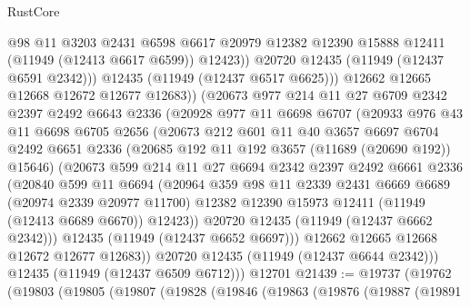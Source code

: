 \begin{lexlean}{RustCore}
\begin{coremodule}
                  @98
                  @11
                  @3203
                  @2431
                  @6598
                  @6617
                  @20979
                  @12382
                  @12390
                  @15888
                  @12411
                  (@11949 (@12413 @6617 @6599))
                  @12423))
              @20720
              @12435
              (@11949 (@12437 @6591 @2342)))
            @12435
            (@11949 (@12437 @6517 @6625)))
          @12662
          @12665
          @12668
          @12672
          @12677
          @12683))
      (@20673
        @977
        @214
        @11
        @27
        @6709
        @2342
        @2397
        @2492
        @6643
        @2336
        (@20928
          @977
          @11
          @6698
          @6707
          (@20933
            @976
            @43
            @11
            @6698
            @6705
            @2656
            (@20673
              @212
              @601
              @11
              @40
              @3657
              @6697
              @6704
              @2492
              @6651
              @2336
              (@20685 @192 @11 @192 @3657 (@11689 (@20690 @192)) @15646)
              (@20673
                @599
                @214
                @11
                @27
                @6694
                @2342
                @2397
                @2492
                @6661
                @2336
                (@20840
                  @599
                  @11
                  @6694
                  (@20964
                    @359
                    @98
                    @11
                    @2339
                    @2431
                    @6669
                    @6689
                    (@20974 @2339 @20977 @11700)
                    @12382
                    @12390
                    @15973
                    @12411
                    (@11949 (@12413 @6689 @6670))
                    @12423))
                @20720
                @12435
                (@11949 (@12437 @6662 @2342)))
              @12435
              (@11949 (@12437 @6652 @6697)))
            @12662
            @12665
            @12668
            @12672
            @12677
            @12683))
        @20720
        @12435
        (@11949 (@12437 @6644 @2342)))
      @12435
      (@11949 (@12437 @6509 @6712)))
    @12701
@21439 := @19737
    (@19762
      (@19803
        (@19805
          (@19807
            (@19828
              (@19846
                (@19863
                  (@19876
                    (@19887
                      (@19891

\end{coremodule}
\end{lexlean}
